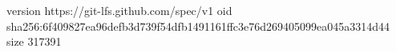 version https://git-lfs.github.com/spec/v1
oid sha256:6f409827ea96defb3d739f54dfb1491161ffc3e76d269405099ea045a3314d44
size 317391
